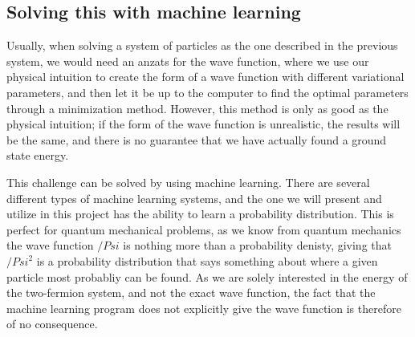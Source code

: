 \documentclass[norsk,a4paper,12pt]{article}
\begin{document}
\subsection{Solving this with machine learning}
Usually, when solving a system of particles as the one described in the previous system, we would need an anzats for the wave function, where we use our physical intuition to create the form of a wave function with different variational parameters, and then let it be up to the computer to find the optimal parameters through a minimization method. However, this method is only as good as the physical intuition; if the form of the wave function is unrealistic, the results will be the same, and there is no guarantee that we have actually found a ground state energy.
\par 
\vspace{3mm}
This challenge can be solved by using machine learning. There are several different types of machine learning systems, and the one we will present and utilize in this project has the ability to learn a probability distribution. This is perfect for quantum mechanical problems, as we know from quantum mechanics the wave function $/Psi$ is nothing more than a probability denisty, giving that $/Psi^2$ is a probability distribution that says something about where a given particle most probabliy can be found. As we are solely interested in the energy of the two-fermion system, and not the exact wave function, the fact that the machine learning program does not explicitly give the wave function is therefore of no consequence.
\end{document}
